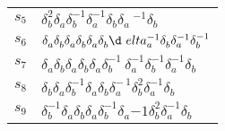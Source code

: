 \documentclass{article}
\begin{document}
\begin{center}
\begin{tabular}{ll}
$s_{5}$ & $\delta_b^{2}\delta_a^{}\delta_b^{-1}\delta_a^{-1}\delta_b^{}\delta_a\
^{-1}\delta_b^{}$ \\
$s_{6}$ & $\delta_a^{}\delta_b^{}\delta_a^{}\delta_b^{}\delta_a^{}\delta_b^{}\d\
elta_a^{-1}\delta_b^{}\delta_a^{-1}\delta_b^{-1}$ \\
$s_{7}$ & $\delta_a^{}\delta_b^{}\delta_a^{}\delta_b^{}\delta_a^{}\delta_b^{-1}\
\delta_a^{-1}\delta_b^{-1}\delta_a^{-1}\delta_b^{}$ \\
$s_{8}$ & $\delta_b^{}\delta_a^{}\delta_b^{-1}\delta_a^{}\delta_b^{}\delta_a^{-\
1}\delta_b^{2}\delta_a^{-1}\delta_b^{}$ \\
$s_{9}$ & $\delta_b^{-1}\delta_a^{}\delta_b^{}\delta_a^{}\delta_b^{-1}\delta_a^\
{-1}\delta_b^{2}\delta_a^{-1}\delta_b^{}$ \\
\bottomrule
\end{tabular}
\end{center}

\thispagestyle{empty}
\end{document}
